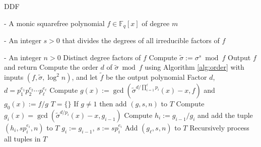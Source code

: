 \documentclass[12pt]{article}
\theoremstyle{plain}
\theoremstyle{definition}
\newcommand{\algbox}[1]{
	\begin{tcolorbox}[width = 0.8\textwidth, colback = white, arc = 2pt, boxrule = 0.5pt] 
		#1 
	\end{tcolorbox}
}
\def\F{\ensuremath{\mathbb{F}}}
\begin{document}
\begin{algorithm}[t]
	\caption{DDF}
	\label{alg:ddf}
	\centering
	\algbox{
	\begin{algorithmic}[1]
		\Require 
		\item[-] A monic squarefree polynomial $f \in \F_q[x]$ of degree $m$
		\item[-] An integer $s > 0$ that divides the degrees of all irreducible factors of $f$
		\item[-] An integer $n > 0$
		\Ensure Distinct degree factors of $f$
		\State\label{step:sigma-s}Compute $\tilde{\sigma} := \sigma^s \bmod f$
		\If {$\tilde{\sigma} = $ id}
			\State Output $f$ and return
		\EndIf
		\State\label{step:order}Compute the order $d$ of $\tilde{\sigma} \bmod f$ using Algorithm 
		\ref{alg:order} with inputs $(f, \tilde{\sigma}, \log^2n)$, and let $\tilde{f}$ be the 
		output polynomial
		\State\label{step:factor-d}Factor $d$, $d = p_1^{e_1} p_2^{e_2} \cdots p_\ell^{e_\ell}$
		\State\label{step:gcd-first}Compute $g(x) := \gcd(\tilde{\sigma}^{d / \prod_{i = 1}^\ell 
		p_i}(x) - x, f)$ and $g_0(x) := f / g$
		\State $T = \{\}$
		\State If $g \ne 1$ then add $(g, s, n)$ to $T$
		\For {$i = 1$ to $\ell$ }\label{step:for-ddf}
			\State Compute $g_i(x) = \gcd(\tilde{\sigma}^{d / p_i}(x) - x, g_{i - 1})$
			\If {$g_i \ne 1$} 
				\State Compute $h_i := g_{i - 1} / g_i$ and add the tuple $(h_i, sp_i^{e_i}, n)$ to 
				$T$
			\Else
				\State $g_i := g_{i - 1}$, $s := sp_i^{e_i}$
			\EndIf
		\EndFor
		\State Add $(g_\ell, s, n)$ to $T$
		\State Recursively process all tuples in $T$
	\end{algorithmic}}
\end{algorithm}
\end{document}
